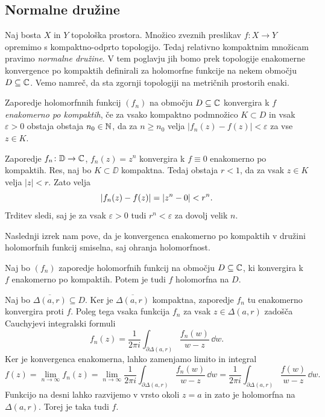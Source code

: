 \subsection{Normalne družine}

Naj bosta \(X\) in \(Y\) topološka prostora. Množico zveznih preslikav \(f \colon X \to Y\) opremimo s kompaktno-odprto topologijo. Tedaj relativno kompaktnim množicam pravimo \emph{normalne družine}. V tem poglavju jih bomo prek topologije enakomerne konvergence po kompaktih definirali za holomorfne funkcije na nekem območju \(D \subseteq \mathbb C\). Vemo namreč, da sta zgornji topologiji na metričnih prostorih enaki.
\begin{definicija}
    Zaporedje holomorfnnih funkcij \((f_n)\) na območju \(D \subseteq \mathbb C\) konvergira k \(f\) \emph{enakomerno po kompaktih}, če za vsako kompaktno podmnožico \(K \subset D\) in vsak \(\varepsilon > 0\) obstaja obstaja \(n_0 \in \mathbb N\), da za \(n \geq n_0\) velja \(|f_n (z) - f(z)| < \varepsilon\) za vse \(z \in K\).
\end{definicija}

\begin{primer} \label{ex:primer}
    Zaporedje \(f_n \colon \mathbb D \to \mathbb C\), \(f_n (z) = z^n\) konvergira k \(f \equiv 0\) enakomerno po kompaktih. Res, naj bo \(K \subset \DD\) kompaktna. Tedaj obstaja \(r < 1\), da za vsak \(z \in K\) velja \(|z| < r\). Zato velja
    \[\left\lvert f_n (z) - f (z)\right\rvert = \left\lvert z^n - 0\right\rvert < r^n.\]
    Trditev sledi, saj je za vsak \(\varepsilon > 0\) tudi \(r^n < \varepsilon\) za dovolj velik \(n\).
\end{primer}

\noindent Naslednji izrek nam pove, da je konvergenca enakomerno po kompaktih v družini holomorfnih funkcij smiselna, saj ohranja holomorfnost.

\begin{izrek}
    Naj bo \((f_n)\) zaporedje holomorfnih funkcij na območju \(D \subseteq \mathbb C\), ki konvergira k \(f\) enakomerno po kompaktih. Potem je tudi \(f\) holomorfna na \(D\).
\end{izrek}

\begin{dokaz}
    Naj bo \(\overline{\Delta (a, r)} \subseteq D\). Ker je \(\overline{\Delta (a, r)}\) kompaktna, zaporedje \(f_n\) tu enakomerno konvergira proti \(f\). Poleg tega vsaka funkcija \(f_n\) za vsak \(z \in \Delta (a, r)\) zadošča Cauchyjevi integralski formuli
    \[f_n (z) = \frac{1}{2 \pi i} \int_{\partial \Delta (a, r)} \frac{f_n (w)}{w - z} \, \dd w.\]
    Ker je konvergenca enakomerna, lahko zamenjamo limito in integral
    \[f (z) = \lim_{n \to \infty} f_n (z) = \lim_{n \to \infty} \frac{1}{2 \pi i} \int_{\partial \Delta (a, r)} \frac{f_n (w)}{w - z} \, \dd w = \frac{1}{2 \pi i} \int_{\partial \Delta (a, r)} \frac{f (w)}{w - z} \, \dd w.\]
    Funkcijo na desni lahko razvijemo v vrsto okoli \(z = a\) in zato je holomorfna na \(\Delta (a, r)\). Torej je taka tudi \(f\).
\end{dokaz}

